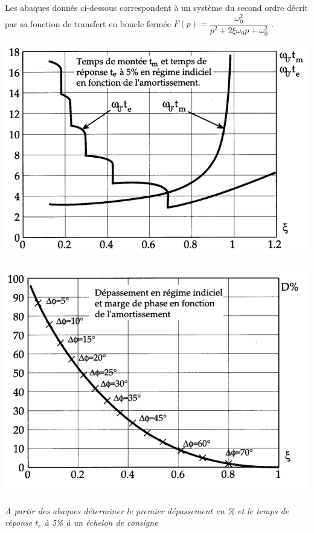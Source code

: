 \documentclass[10pt,fleqn]{article} %
\begin{document}
\begin{multicols}{2}
\ifprof
\begin{corrige}
\end{corrige}
\else \fi


Les abaques donnés ci-dessous correspondent à un système du second ordre décrit par sa fonction de transfert en boucle fermée $F(p)=\dfrac{\omega_0^2}{p^2+2\xi\omega_0 p + \omega_0^2}$ .

\begin{center}
\includegraphics[width=\linewidth]{images/figure_09}

\includegraphics[width=\linewidth]{images/figure_10}
\end{center}

\subparagraph{}
\textit{A partir des abaques déterminer le premier dépassement en \% et le temps de réponse $t_e$  à 5\% à un échelon de consigne}


\end{multicols}
\end{document}

